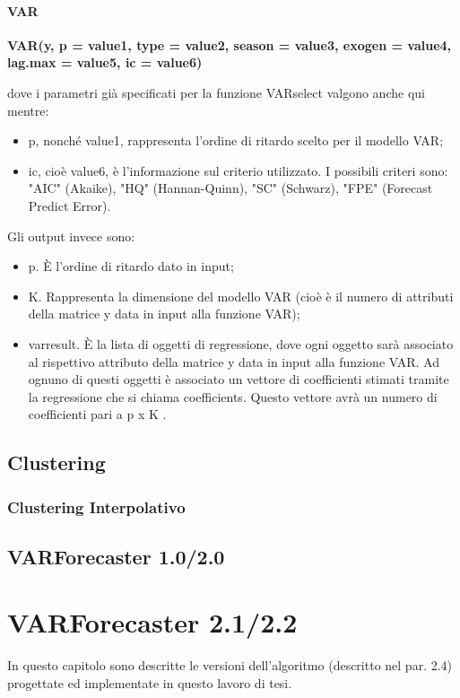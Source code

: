\documentclass[12pt,a4paper,twoside,openright]{book}
\begin{document}
\subsubsection{VAR}
\begin{center}
{\bfseries 
VAR(y, p = value1, type = value2, season = value3, exogen = value4, lag.max = value5, ic = value6)
}
\end{center}
dove i parametri già specificati per la funzione VARselect valgono anche qui mentre:
\begin{itemize}
\item p, nonché value1, rappresenta l'ordine di ritardo scelto per il modello VAR;
\item ic, cioè value6, è l'informazione sul criterio utilizzato. I possibili criteri sono: "AIC" (Akaike), "HQ" (Hannan-Quinn), "SC" (Schwarz), "FPE" (Forecast Predict Error).
\end{itemize}
Gli output invece sono:
\begin{itemize}
\item p. È l'ordine di ritardo dato in input;
\item K. Rappresenta la dimensione del modello VAR (cioè è il numero di attributi della matrice y data in input alla funzione VAR);
\item varresult. È la lista di oggetti di regressione, dove ogni oggetto sarà associato al rispettivo attributo della matrice y data in input alla funzione VAR. Ad ognuno di questi oggetti è associato un vettore di coefficienti stimati tramite la regressione che si chiama coefficients. Questo vettore avrà un numero di coefficienti pari a p x K \cite{13a}.
\end{itemize}
\newpage
\section{Clustering}

\newpage
\subsection{Clustering Interpolativo}
\newpage
\section{VARForecaster 1.0/2.0}
\chapter{VARForecaster 2.1/2.2}
In questo capitolo sono descritte le versioni dell'algoritmo (descritto nel par. 2.4) progettate ed implementate in questo lavoro di tesi. 
\end{document}
